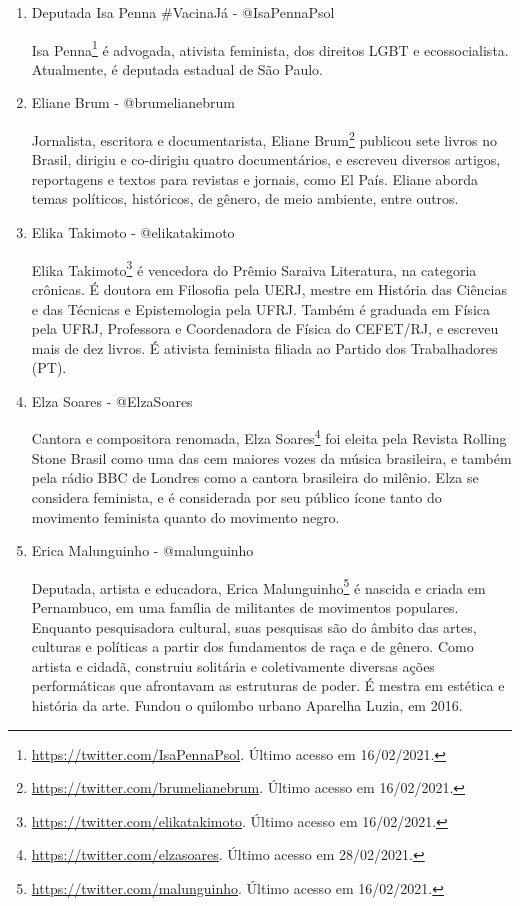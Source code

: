 \documentclass[
	12pt,				%
	openright,			%
	twoside,			%
	a4paper,			%
	english,			%
	brazil				%
	]{abntex2}
\begin{document}
\begin{anexosenv}
\begin{enumerate}
 \item Deputada Isa Penna $\#$VacinaJá - @IsaPennaPsol
 
 Isa Penna\footnote{\url{https://twitter.com/IsaPennaPsol}. Último acesso em 16/02/2021.} é advogada, ativista feminista, dos direitos LGBT e ecossocialista. Atualmente, é deputada estadual de São Paulo.

 \item Eliane Brum - @brumelianebrum
 
 Jornalista, escritora e documentarista, Eliane Brum\footnote{\url{https://twitter.com/brumelianebrum}. Último acesso em 16/02/2021.} publicou sete livros no Brasil, dirigiu e co-dirigiu quatro documentários, e escreveu diversos artigos, reportagens e textos para revistas e jornais, como El País. Eliane aborda temas políticos, históricos, de gênero, de meio ambiente, entre outros.

 \item Elika Takimoto - @elikatakimoto
 
 Elika Takimoto\footnote{\url{https://twitter.com/elikatakimoto}. Último acesso em 16/02/2021.} é vencedora do Prêmio Saraiva Literatura, na categoria crônicas. É doutora em Filosofia pela UERJ, mestre em História das Ciências e das Técnicas e Epistemologia pela UFRJ. Também é graduada em Física pela UFRJ, Professora e Coordenadora de Física do CEFET/RJ, e escreveu mais de dez livros. É ativista feminista filiada ao Partido dos Trabalhadores (PT).
\newpage
 \item Elza Soares - @ElzaSoares
 
 Cantora e compositora renomada, Elza Soares\footnote{\url{https://twitter.com/elzasoares}. Último acesso em 28/02/2021.} foi eleita pela Revista Rolling Stone Brasil como uma das cem maiores vozes da música brasileira, e também pela rádio BBC de Londres como a cantora brasileira do milênio. Elza se considera feminista, e é considerada por seu público ícone tanto do movimento feminista quanto do movimento negro.

 \item Erica Malunguinho - @malunguinho
 
 Deputada, artista e educadora, Erica Malunguinho\footnote{\url{https://twitter.com/malunguinho}. Último acesso em 16/02/2021.} é nascida e criada em Pernambuco, em uma família de militantes de movimentos populares. Enquanto pesquisadora cultural, suas pesquisas são do âmbito das artes, culturas e políticas a partir dos fundamentos de raça e de gênero. Como artista e cidadã, construiu solitária e coletivamente diversas ações performáticas que afrontavam as estruturas de poder. É mestra em estética e história da arte. Fundou o quilombo urbano Aparelha Luzia, em 2016.


\end{enumerate}
\end{anexosenv}
\end{document}
